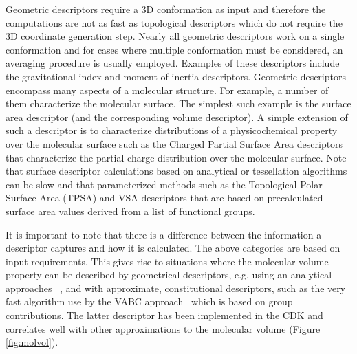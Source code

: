 \documentclass[letterpaper, 12pt]{article}
\begin{document}
Geometric descriptors require a 3D conformation as input and therefore
the computations are not as fast as topological descriptors which do
not require the 3D coordinate generation step. Nearly all geometric
descriptors work on a single conformation and for cases where multiple
conformation must be considered, an averaging procedure is usually
employed. Examples of these descriptors include the gravitational
index \cite{Katritzky:1996ly} and moment of inertia descriptors.
Geometric descriptors encompass many aspects of a molecular
structure. For example, a number of them characterize the molecular
surface. The simplest such example is the surface area descriptor (and
the corresponding volume descriptor). A simple extension of such a
descriptor is to characterize distributions of a physicochemical
property over the molecular surface such as the Charged Partial
Surface Area descriptors \cite{Stanton:1990aa} that characterize the
partial charge distribution over the molecular surface. Note that
surface descriptor calculations based on analytical
\cite{Connolly:1983aa} or tessellation algorithms
\cite{Eisenhaber:1995qf} can be slow and that parameterized methods
such as the Topological Polar Surface Area (TPSA) \cite{Ertl:2000aa}
and VSA descriptors \cite{Labute:2008aa} that are based on
precalculated surface area values derived from a list of functional
groups.

It is important to note that there is a difference between the
information a descriptor captures and how it is calculated. The above
categories are based on input requirements. This gives rise to
situations where the molecular volume property can be
described by geometrical descriptors, e.g. using an analytical
approaches ~\cite{Eisenhaber:1995qf}, and with approximate,
constitutional descriptors, such as the very fast algorithm use by the
VABC approach~\cite{Zhao:2003fk} which is based on group
contributions.  The latter descriptor has been implemented in the CDK
and correlates well with other approximations to the molecular volume
(Figure \ref{fig:molvol}).
\end{document}
